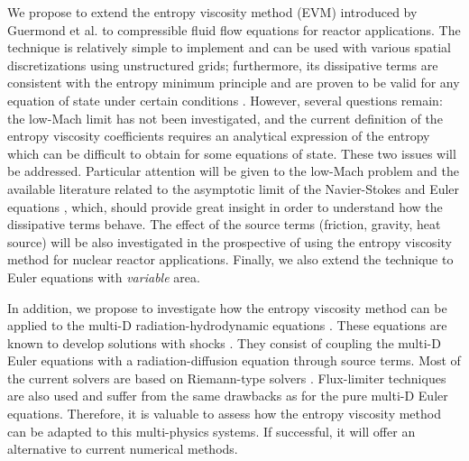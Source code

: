 We propose to extend the entropy viscosity method (EVM) introduced by Guermond et al. to compressible fluid flow equations for reactor applications. The technique is relatively simple to implement and can be used with various spatial discretizations using unstructured grids; furthermore, its dissipative terms are consistent with the entropy minimum principle and are proven to be valid for any equation of state under certain conditions \cite{jlg}. However, several questions remain: the low-Mach limit has not been investigated, and the current definition of the entropy viscosity coefficients requires an analytical expression of the entropy which can be difficult to obtain for some equations of state. These two issues will be addressed. Particular attention will be given to the low-Mach problem and the available literature related to the asymptotic limit of the Navier-Stokes \cite{Muller} and Euler equations \cite{LowMach1, LowMach2}, which,  should provide great insight in order to understand how the dissipative terms behave. The effect of the source terms (friction, gravity, heat source) will be also investigated in the prospective of using the entropy viscosity method for nuclear reactor applications. Finally, we also extend the technique to Euler equations with \emph{variable} area.


In addition, we propose to investigate how the entropy viscosity method can be applied to the multi-D radiation-hydrodynamic equations \cite{LowrieMorelHittinger}. These equations are known to develop solutions with shocks \cite{Balsara}. They consist of coupling the multi-D Euler equations with a radiation-diffusion equation through source terms.  Most of the current solvers are based on Riemann-type solvers \cite{LowrieMorel}. Flux-limiter techniques \cite{EdwardsMorelLowrie} are also used and suffer from the same drawbacks as for the pure multi-D Euler equations. Therefore, it is valuable to assess how the entropy viscosity method can be adapted to this multi-physics systems. If successful, it will offer an alternative to current numerical methods.\\


